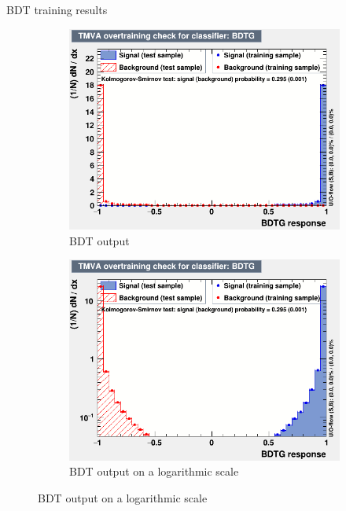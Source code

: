 \documentclass{beamer}
\begin{document}
\begin{frame}{BDT training results}
  \begin{figure}
    \centering
    \vspace{-0.2cm}
    \begin{subfigure}{0.5\textwidth}
      \includegraphics[width = 1.0\textwidth]{Plots/overtrain_BDTG.png}
      \caption{BDT output}
    \end{subfigure}%
    \begin{subfigure}{0.5\textwidth}
      \includegraphics[width = 1.0\textwidth]{Plots/overtrain_BDTG_log.png}
      \caption{BDT output on a logarithmic scale}
    \end{subfigure}
  \end{figure}
\end{frame}
\end{document}
